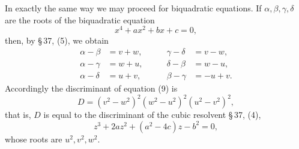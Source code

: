 \documentclass[11pt]{article}
\begin{document}
In exactly the same way we may proceed for biquadratic equations. If $\alpha,\beta,\gamma,\delta$ are the roots of the biquadratic equation
\begin{equation}
x^4+ax^2+bx+c=0,
\tag{9}
\end{equation}
then, by \S\,37, (5), we obtain
\begin{equation}
\begin{alignedat}{2}
\alpha-\beta&=v+w,          &\qquad \gamma-\delta&=v-w,\\
\alpha-\gamma&=w+u,         &\qquad \delta-\beta&=w-u,\\
\alpha-\delta&=u+v,         &\qquad \beta-\gamma&=-u+v.
\end{alignedat}
\tag{10}
\end{equation}
Accordingly the discriminant of equation (9) is
\[
D=(v^2-w^2)^2(w^2-u^2)^2(u^2-v^2)^2,
\]
that is, $D$ is equal to the discriminant of the cubic resolvent \S\,37, (4),
\begin{equation}
z^3+2az^2+(a^2-4c)z-b^2=0,
\tag{11}
\end{equation}
whose roots are $u^2,v^2,w^2$.
\end{document}
